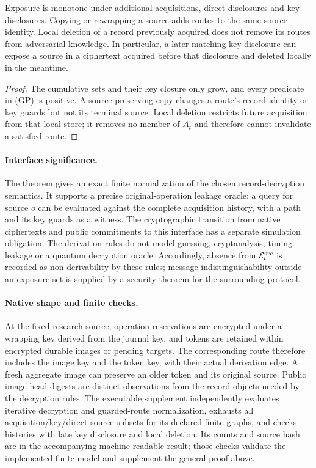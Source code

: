 \begin{corollary}
\label{cor:guarded-history}
Exposure is monotone under additional acquisitions, direct disclosures
and key disclosures.  Copying or rewrapping a source adds routes to the
same source identity.  Local deletion of a record previously acquired
does not remove its routes from adversarial knowledge.  In particular,
a later matching-key disclosure can expose a source in a ciphertext
acquired before that disclosure and deleted locally in the meantime.
\end{corollary}
\begin{proof}
The cumulative sets and their key closure only grow, and every predicate
in (GP) is positive.  A source-preserving copy changes a route's record
identity or key guards but not its terminal source.  Local deletion
restricts future acquisition from that local store; it removes no member
of $A_t$ and therefore cannot invalidate a satisfied route.
\end{proof}

\paragraph{Interface significance.}
The theorem gives an exact finite normalization of the chosen
record-decryption semantics.  It supports a precise original-operation
leakage oracle: a query for source $o$ can be evaluated against the
complete acquisition history, with a path and its key guards as a witness.
The cryptographic transition from native ciphertexts and public
commitments to this interface has a separate simulation obligation.
The derivation rules do not model guessing, cryptanalysis, timing leakage
or a quantum decryption oracle.  Accordingly, absence from $\mathcal E^{\rm src}_t$ is
recorded as non-derivability by these rules; message indistinguishability
outside an exposure set is supplied by a security theorem for the
surrounding protocol.

\paragraph{Native shape and finite checks.}
At the fixed research source, operation reservations are encrypted under
a wrapping key derived from the journal key, and tokens are retained
within encrypted durable images or pending targets.  The corresponding
route therefore includes the image key and the token key, with their
actual derivation edge.  A fresh aggregate image can preserve an older
token and its original source.  Public image-head digests are distinct
observations from the record objects needed by the decryption rules.
The executable supplement independently evaluates iterative decryption
and guarded-route normalization, exhausts all acquisition/key/direct-source
subsets for its declared finite graphs, and checks histories with late
key disclosure and local deletion.  Its counts and source hash are in
the accompanying machine-readable result; those checks validate the
implemented finite model and supplement the general proof above.
